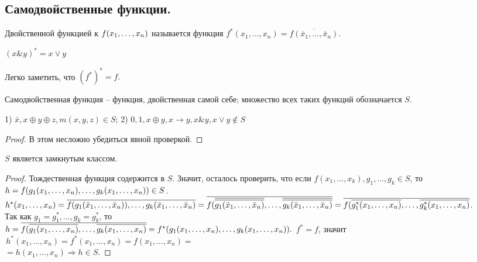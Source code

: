 \subsection{Самодвойственные функции.}
\begin{definition} Двойственной функцией к $f(x_1, \ldots, x_n)$ называется функция $f^*(x_1,\ldots,x_n)=\overline{f(\bar{x}_1,\ldots,\bar{x}_n)}.$ \end{definition}
\begin{example} $(x\&y)^*=x \vee y$ \end{example}

\noindent Легко заметить, что $(f^*)^*=f.$
\begin{definition}
Самодвойственная функция -- функция, двойственная самой себе; множество всех таких функций обозначается $S$.
\end{definition}
\begin{statement} 1) $\bar{x},x\oplus y \oplus z, m(x,y,z) \in S$; 2) $0,1,x\oplus y, x\rightarrow y, x \& y, x \vee y \notin S $ 
\end{statement}
\begin{proof}
	В этом несложно убедиться явной проверкой. 
\end{proof}	
\begin{lemma}
	$S$ является замкнутым классом.
\end{lemma}
\begin{proof}
	Тождественная функция содержится в ${S}$. Значит, осталось проверить, что если $f(x_1, \ldots,x_k), g_1, \ldots, g_k \in S$, то $h=f(g_1(x_1, \ldots, x_n),\ldots,g_k(x_1, \ldots, x_n)) \in S $. \\
	$h^*(x_1,\ldots,x_n)=\overline{f(g_1(\bar{x}_1,\ldots,\bar{x}_n)),\ldots,g_k(\bar{x}_1,\ldots,\bar{x}_n)}=\overline{f(\overline{\overline{g_1(\bar{x}_1,\ldots,\bar{x}_n)}},\ldots,\overline{\overline{g_k(\bar{x}_1,\ldots,\bar{x}_n)}}} = \\\overline{f(\overline{g^*_{1}({x_1},\ldots,{x_n})},\ldots,\overline{g^*_k({x_1},\ldots,{x_n})}} $. \\
	Так как $g_1=g^*_1,\ldots,g_k=g^*_k$, то \\$h=\overline{f(\overline{g_{1}({x_1},\ldots,{x_n})},\ldots,\overline{g_k({x_1},\ldots,{x_n})}}=f^*(g_1(x_1,\ldots, x_n),\ldots,g_k(x_1,\ldots,x_n)).\\ $
	$f^*=f$, значит 
	$\,h^*(x_1,\ldots,x_n)=f^*(x_1,\ldots,x_n)=f(x_1,\ldots,x_n)=$\\$=h(x_1,\ldots,x_n) \Rightarrow h \in S.$
\end{proof}
